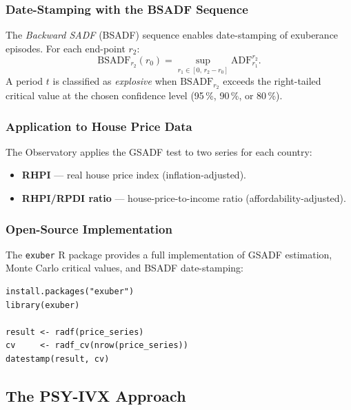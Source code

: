 \subsubsection{Date-Stamping with the BSADF Sequence}

The \textit{Backward SADF} (BSADF) sequence enables date-stamping of
exuberance episodes. For each end-point $r_2$:
\begin{equation}
  \label{eq:bsadf}
  \mathrm{BSADF}_{r_2}(r_0)
    = \sup_{r_1 \in [0,\, r_2 - r_0]} \mathrm{ADF}_{r_1}^{r_2}.
\end{equation}
A period $t$ is classified as \textit{explosive} when
$\mathrm{BSADF}_{r_2}$ exceeds the right-tailed critical value at the
chosen confidence level (95\,\%, 90\,\%, or 80\,\%).

\subsubsection{Application to House Price Data}

The Observatory applies the GSADF test to two series for each country:
\begin{itemize}
  \item \textbf{RHPI} --- real house price index (inflation-adjusted).
  \item \textbf{RHPI/RPDI ratio} --- house-price-to-income ratio
        (affordability-adjusted).
\end{itemize}

\subsubsection{Open-Source Implementation}

The \texttt{exuber} \textsf{R} package \citep{exuber} provides a full
implementation of GSADF estimation, Monte Carlo critical values, and
BSADF date-stamping:

\begin{lstlisting}[caption={GSADF estimation with \texttt{exuber}}]
install.packages("exuber")
library(exuber)

result <- radf(price_series)
cv     <- radf_cv(nrow(price_series))
datestamp(result, cv)
\end{lstlisting}

\subsection{The PSY-IVX Approach}
\label{subsec:psyivx}

